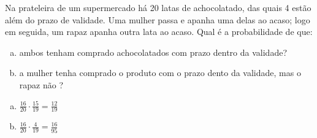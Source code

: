 \begin{ex}
Na prateleira de um supermercado há 20 latas de achocolatado, das quais 4 estão além do prazo de validade. Uma mulher passa e apanha uma delas ao acaso; logo em seguida, um rapaz apanha outra lata ao acaso. Qual é a probabilidade de que:
   \begin{enumerate}[(a)]
   \item ambos tenham comprado achocolatados com prazo dentro da validade?
   \item a mulher tenha comprado o produto com o prazo dento da validade, mas o rapaz não ?
   \end{enumerate}
     \begin{sol}
       \phantom{A} 
        \begin{enumerate} [(a)]
            \item $\frac{16}{20}\cdot\frac{15}{19}=\frac{12}{19}$
            \item $\frac{16}{20}\cdot\frac{4}{19}=\frac{16}{95}$
        \end{enumerate}
       
     \end{sol}
\end{ex}